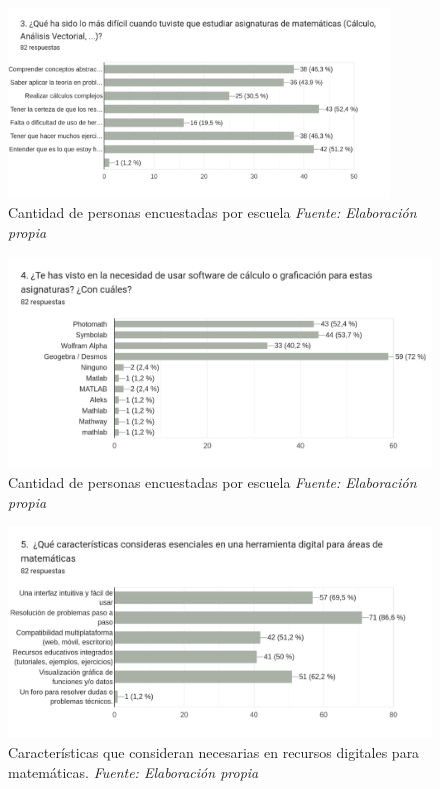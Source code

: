 \begin{figure}[H]
	\centering
	\includegraphics[width=0.9\textwidth]{img/appendixA/3_dificil_en_mates.png}
	\caption[Cantidad de personas encuestadas por escuela]{Cantidad de personas encuestadas por escuela \textit{Fuente: Elaboración propia}}
	\label{fig:app1_dificultad_en_mates}  %
\end{figure}

\begin{figure}[H]
	\centering
	\includegraphics[width=1\textwidth]{img/appendixA/4_software_para_mates.png}
	\caption[Cantidad de personas encuestadas por escuela]{Cantidad de personas encuestadas por escuela \textit{Fuente: Elaboración propia}}
	\label{fig:app1_software_para_mates}  %
\end{figure}


\begin{figure}[H]
	\centering
	\includegraphics[width=1\textwidth]{img/appendixA/5_caracteristicas_para_app_mates.png}
	\caption[Características que consideran necesarias en recursos digitales para matemáticas.]{Características que consideran necesarias en recursos digitales para matemáticas. \textit{Fuente: Elaboración propia}}
	\label{fig:app1_caracteristicas_para_app_mates}  %
\end{figure}


